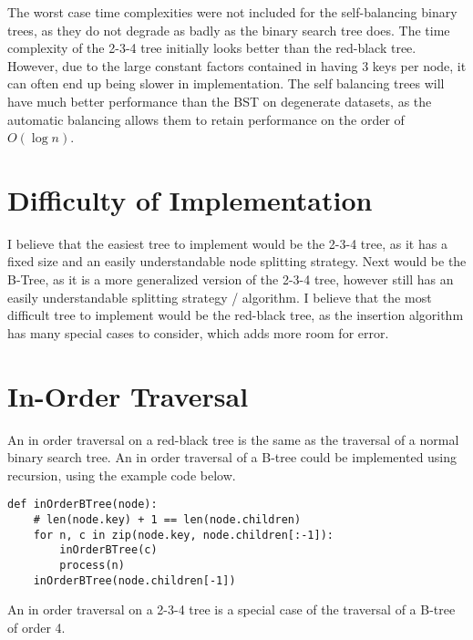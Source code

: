 \documentclass{article}
\begin{document}
The worst case time complexities were not included for the self-balancing binary trees,
as they do not degrade as badly as the binary search tree does.
The time complexity of the 2-3-4 tree initially looks better than the red-black tree. However,
due to the large constant factors contained in having 3 keys per node, it can often
end up being slower in implementation.
The self balancing trees will have much better performance than the BST on degenerate datasets,
as the automatic balancing allows them to retain performance on the order of $O\left(\log n\right)$.

\section{Difficulty of Implementation}
I believe that the easiest tree to implement
would be the 2-3-4 tree, as it has a fixed size
and an easily understandable node splitting
strategy.
Next would be the B-Tree, as it is a more
generalized version of the 2-3-4 tree, however
still has an easily understandable splitting
strategy / algorithm.
I believe that the most difficult tree to implement would
be the red-black tree, as the insertion algorithm has many special
cases to consider, which adds more room for error.
\section{In-Order Traversal}
An in order traversal on a red-black tree is the same as the traversal
of a normal binary search tree.
An in order traversal of a B-tree could be implemented using recursion,
using the example code below.
\begin{lstlisting}
def inOrderBTree(node):
    # len(node.key) + 1 == len(node.children)
    for n, c in zip(node.key, node.children[:-1]):
        inOrderBTree(c)
        process(n)
    inOrderBTree(node.children[-1])
\end{lstlisting}
An in order traversal on a 2-3-4 tree is a special case of
the traversal of a B-tree of order 4.
\end{document}
